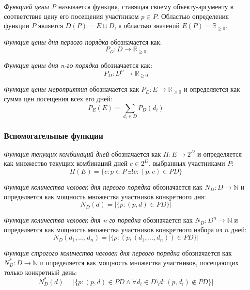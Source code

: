 \textit{Функцией цены P} называется функция, ставящая своему объекту-аргументу в соответствие цену его посещения участником $p \in P$. Областью определения функции $P$ является $D(P) = E \cup D$, а областью значений $E(P) = \mathbb{R}_{\ge 0}$.

\textit{Функция цены дня первого порядка} обозначается как:
\begin{equation}
	P_D: D \rightarrow \mathbb{R}_{\ge 0}
\end{equation}

\textit{Функция цены дня n-го порядка} обозначается как:
\begin{equation}
	P_D: D^n \rightarrow \mathbb{R}_{\ge 0}
\end{equation}

\textit{Функция цены мероприятия} обозначается как $P_E: E \rightarrow \mathbb{R}_{\ge 0}$ и определяется как сумма цен посещения всех его дней:
\begin{equation}
	P_E(E) = \sum_{d_i \in D}{P_D(d_i)}
\end{equation}

\subsubsection{Вспомогательные функции}

\textit{Функция текущих комбинаций дней} обозначается как $H: E \rightarrow 2^D$ и определяется как множество текущих комбинаций дней $c \in 2^D$, выбранных участниками $P$:
\begin{equation}
	H(E) = \{c: p \in P \ \exists! c: (p, c) \in PD\}
\end{equation}

\textit{Функция количества человек дня первого порядка} обозначается как \newline $N_D: D \rightarrow \mathbb{N}$ и определяется как мощность множества участников конкретного дня:
\begin{equation}
	N_D(d) = |\{p: (p, d) \in PD\}|
\end{equation}

\textit{Функция количества человек дня n-го порядка} обозначается как \newline $N_D: D^n \rightarrow \mathbb{N}$ и определяется как мощность множества участников конкретного набора из $n$ дней:
\begin{equation}
	N_D(d_1, \dots, d_n) = |\{p: (p, (d_1, \dots, d_n)) \in PD\}|
\end{equation}

\textit{Функция строгого количества человек дня первого порядка} обозначается как $N_D^*: D \rightarrow \mathbb{N}$ и определяется как мощность множества участников, посещающих только конкретный день:
\begin{equation}
	N_D^*(d) = |\{p:(p, d) \in PD \wedge \forall d_i \in D \setminus d : (p, d_i) \notin PD\}|
\end{equation}

